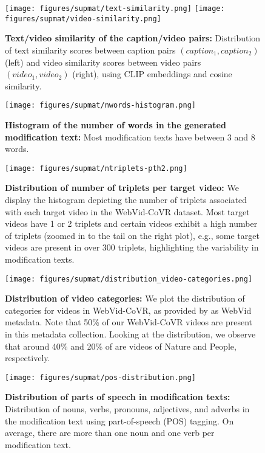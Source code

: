 \begin{figure}
  \centering
  \texttt{[image: figures/supmat/text-similarity.png]}\hfill
  \texttt{[image: figures/supmat/video-similarity.png]}
    \caption{\textbf{Text/video similarity of the caption/video pairs:} 
    Distribution of text similarity scores between caption pairs $(caption_1, caption_2)$ (left) 
    and video similarity scores between video pairs $(video_1, video_2)$ (right),
    using CLIP embeddings and cosine similarity.}
  \label{app:fig:plot-similarity}
\end{figure}

\begin{figure}
  \centering
  \texttt{[image: figures/supmat/nwords-histogram.png]}
  \caption{\textbf{Histogram of the number of words in the generated modification text:} Most modification texts have between 3 and 8 words.
  }
  \label{app:fig:nwords-histogram}
\end{figure}

\begin{figure}
  \centering
  \texttt{[image: figures/supmat/ntriplets-pth2.png]}
    \caption{\textbf{Distribution of number of triplets per target video:} 
    We display the histogram depicting the number of triplets associated with each target video in the WebVid-CoVR dataset. 
    Most target videos have 1 or 2 triplets and certain videos exhibit 
    a high number of triplets (zoomed in to the tail on the right plot), e.g., some target videos are present in over 300 triplets, highlighting the variability in modification texts.
    }
  \label{app:fig:ntriplets-pth2}
\end{figure}



\begin{figure}\centering
  \texttt{[image: figures/supmat/distribution\_video-categories.png]}
  \vspace{-0.2cm}
  \caption{\textbf{Distribution of video categories:}  
  {We plot the distribution of categories for videos in WebVid-CoVR, as provided by \cite{cleanvid} as WebVid metadata. Note that 50\% of our WebVid-CoVR videos are present in this metadata collection.
  Looking at the distribution, we observe that around 40\% and 20\% of \ourDS are videos of Nature and People, respectively.}
  }
  \label{app:fig:video-categories}
\end{figure}

\begin{figure} \centering
  \vspace{0.1cm}
  \texttt{[image: figures/supmat/pos-distribution.png]}
  \vspace{-0.2cm}
  \caption{\textbf{Distribution of parts of speech in modification texts:}  
  Distribution of nouns, verbs, pronouns, adjectives, and adverbs in the modification text using part-of-speech (POS) tagging.
  On average, there are more than one noun and one verb per modification text.
  }
  \label{app:fig:pos-distribution}
\end{figure}


